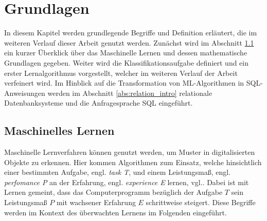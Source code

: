 \chapter{Grundlagen}
\label{kap:fund}
In diesem Kapitel werden grundlegende Begriffe und Definition erläutert, die im weiteren Verlauf dieser Arbeit genutzt werden. Zunächst wird im Abschnitt \ref{abs:mathe_intro} ein kurzer Überklick über das Maschinelle Lernen und dessen mathematische Grundlagen gegeben. Weiter wird die Klassifikationsaufgabe definiert und ein erster Lernalgorithmus vorgestellt, welcher im weiteren Verlauf der Arbeit verfeinert wird. Im Hinblick auf die Transformation von ML-Algorithmen in SQL-Anweisungen werden im Abschnitt \ref{abs:relation_intro} relationale Datenbanksysteme und die Anfragesprache SQL eingeführt.
\section{Maschinelles Lernen}
\label{abs:mathe_intro}
Maschinelle Lernverfahren können genutzt werden, um Muster in digitalisierten Objekte zu erkennen. Hier kommen Algorithmen zum Einsatz, welche hinsichtlich einer bestimmten Aufgabe, engl. \textit{task T}, und einem Leistungsmaß, engl. \textit{perfomance P} an der Erfahrung, engl. \textit{experience E} lernen, vgl.\cite{Goodfellow-et-al-2016}. Dabei ist mit Lernen gemeint, dass das Computerprogramm bezüglich der Aufgabe $T$ sein
Leistungsmaß $P$ mit wachsener Erfahrung $E$ schrittweise steigert. Diese Begriffe werden im Kontext des überwachten Lernens im Folgenden eingeführt.


